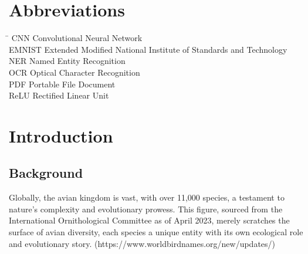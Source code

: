 


\chapter*{Abbreviations}
\begin{tabbing}
\hspace{50mm}\=\kill
CNN \>  Convolutional Neural Network \\
EMNIST \> Extended Modified National Institute of Standards and Technology\\
NER \> Named Entity Recognition\\
OCR \> Optical Character Recognition\\
PDF \> Portable File Document\\
ReLU \> Rectified Linear Unit\\
\end{tabbing}
\newpage
{}

\chapter{Introduction}
\section{Background}\label{sec:bkgrnd}%
Globally, the avian kingdom is vast, with over 11,000 species, a testament to nature's complexity and evolutionary prowess. This figure, sourced from the International Ornithological Committee as of April 2023, merely scratches the surface of avian diversity, each species a unique entity with its own ecological role and evolutionary story. (https://www.worldbirdnames.org/new/updates/)


